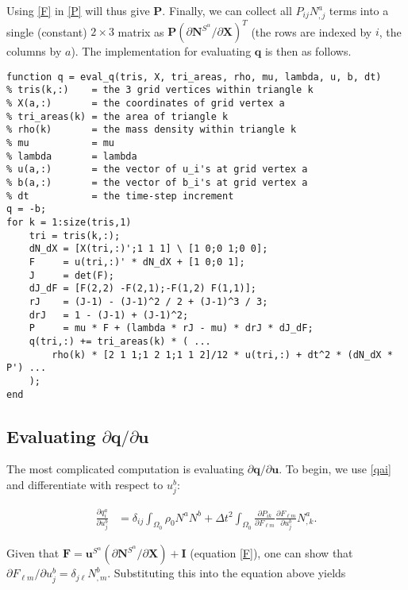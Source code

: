 \documentclass{article}
\begin{document}
Using \eqref{F} in \eqref{P} will thus give \(\mathbf{P}\).  Finally, we can collect all \(P_{ij} N^a_{,j}\) terms into a single (constant) \(2 \times 3\) matrix as \(\mathbf{P} \left( \partial \mathbf{N}^{S^{\alpha}} / \partial \mathbf{X} \right)^T\) (the rows are indexed by \(i\), the columns by \(a\)).  The implementation for evaluating \(\mathbf{q}\) is then as follows.

\begin{verbatim}
function q = eval_q(tris, X, tri_areas, rho, mu, lambda, u, b, dt)
% tris(k,:)    = the 3 grid vertices within triangle k
% X(a,:)       = the coordinates of grid vertex a
% tri_areas(k) = the area of triangle k
% rho(k)       = the mass density within triangle k
% mu           = mu
% lambda       = lambda
% u(a,:)       = the vector of u_i's at grid vertex a
% b(a,:)       = the vector of b_i's at grid vertex a
% dt           = the time-step increment
q = -b;
for k = 1:size(tris,1)
    tri = tris(k,:);
    dN_dX = [X(tri,:)';1 1 1] \ [1 0;0 1;0 0];
    F     = u(tri,:)' * dN_dX + [1 0;0 1];
    J     = det(F);
    dJ_dF = [F(2,2) -F(2,1);-F(1,2) F(1,1)];
    rJ    = (J-1) - (J-1)^2 / 2 + (J-1)^3 / 3;
    drJ   = 1 - (J-1) + (J-1)^2;
    P     = mu * F + (lambda * rJ - mu) * drJ * dJ_dF;
    q(tri,:) += tri_areas(k) * ( ...
        rho(k) * [2 1 1;1 2 1;1 1 2]/12 * u(tri,:) + dt^2 * (dN_dX * P') ...
    );
end

\end{verbatim}

\subsection{Evaluating \(\partial \mathbf{q} / \partial \mathbf{u}\)}

The most complicated computation is evaluating \(\partial \mathbf{q} / \partial \mathbf{u}\).  To begin, we use \eqref{qai} and differentiate with respect to \(u^b_j\):

\begin{equation}
\begin{split}
\frac{\partial q^a_i}{\partial u^b_j}
  & = \delta_{ij} \int_{\Omega_0} \rho_0 N^a N^b
    + \Delta t^2 \int_{\Omega_0} \frac{\partial P_{ik}}{\partial F_{\ell m}} \frac{\partial F_{\ell m}}{\partial u^b_j} N^a_{,k}.
\end{split}
\end{equation}

Given that \(\mathbf{F} = \mathbf{u}^{S^{\alpha}} \left( \partial \mathbf{N}^{S^{\alpha}} / \partial \mathbf{X} \right) + \mathbf{I}\) (equation \eqref{F}), one can show that \(\partial F_{\ell m} / \partial u^b_j = \delta_{j \ell} N^b_{,m}\).  Substituting this into the equation above yields
\end{document}

